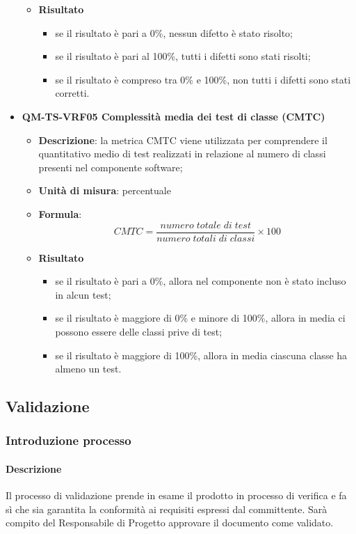 \begin{itemize}
\begin{itemize}
							\item\textbf{Risultato}
								\begin{itemize}
									\item se il risultato è pari a 0\%, nessun difetto è stato risolto;
									\item se il risultato è pari al 100\%, tutti i difetti sono stati risolti;
									\item se il risultato è compreso tra 0\% e 100\%, non tutti i difetti sono stati corretti.
								\end{itemize}
						\end{itemize}
					\item\textbf{QM-TS-VRF05 Complessità media dei test di classe (CMTC)}
						\begin{itemize}
							\item\textbf{Descrizione}: la metrica CMTC viene utilizzata per comprendere il quantitativo medio di test realizzati in relazione al numero di classi presenti nel componente software;
							\item\textbf{Unità di misura}: percentuale
							\item\textbf{Formula}: 
								\[ CMTC = \frac{\mathit{numero\;totale\;di\;test}}{\mathit{numero\;totali\;di\;classi}} \times 100\]
							\item\textbf{Risultato}
								\begin{itemize}
									\item se il risultato è pari a 0\%, allora nel componente non è stato incluso in alcun test;
									\item se il risultato è maggiore di 0\% e minore di 100\%, allora in media ci possono essere delle classi prive di test;
									\item se il risultato è maggiore di 100\%, allora in media ciascuna classe ha almeno un test.
								\end{itemize}
						\end{itemize}
				\end{itemize}
\fi
	\subsection{Validazione}
		\subsubsection{Introduzione processo}
			\paragraph{Descrizione}
				Il processo di validazione prende in esame il prodotto in processo di verifica e fa sì che sia garantita la conformità ai requisiti espressi dal committente. Sarà compito del Responsabile di Progetto approvare il documento come validato.
